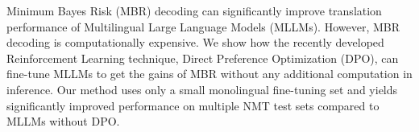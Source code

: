 Minimum Bayes Risk (MBR) decoding can significantly improve translation performance of Multilingual Large Language Models (MLLMs). However, MBR decoding is computationally expensive.  We show how the recently developed Reinforcement Learning technique, Direct Preference Optimization (DPO), can fine-tune MLLMs to get the gains of MBR without any additional computation in inference.  Our method uses only a small monolingual fine-tuning set and yields significantly improved performance on multiple NMT test sets compared to  MLLMs without DPO.